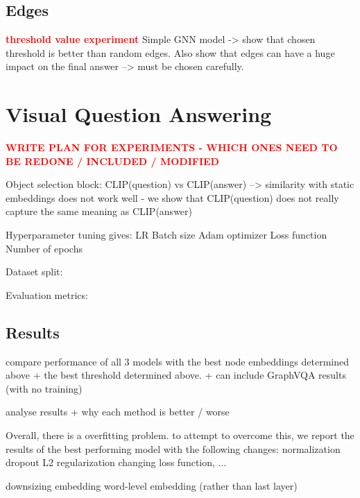 \subsection{Edges}

\textcolor{red}{\textbf{threshold value experiment}}
Simple GNN model -> show that chosen threshold is better than random edges.
Also show that edges can have a huge impact on the final answer --> must be chosen carefully.


\section{Visual Question Answering}


\textcolor{red}{\textbf{WRITE PLAN FOR EXPERIMENTS - WHICH ONES NEED TO BE REDONE / INCLUDED / MODIFIED}}

Object selection block: CLIP(question) vs CLIP(answer) --> similarity with static embeddings does not work well - we show that CLIP(question) does not really capture the same meaning as CLIP(answer)

Hyperparameter tuning gives:
LR
Batch size
Adam optimizer
Loss function
Number of epochs

Dataset split:

Evaluation metrics:

\subsection{Results}

compare performance of all 3 models with the best node embeddings determined above + the best threshold determined above.
+ can include GraphVQA results (with no training)

analyse results + why each method is better / worse

Overall, there is a overfitting problem. to attempt to overcome this, we report the results of the best performing model with the following changes: 
normalization
dropout
L2 regularization
changing loss function, ...


downsizing embedding
word-level embedding (rather than last layer)